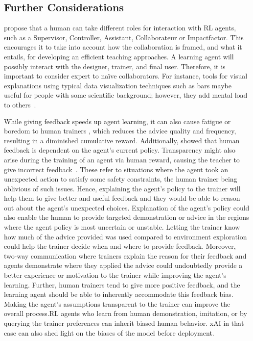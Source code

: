 \documentclass[twoside,11pt]{article}
\begin{document}
\subsection{Further Considerations}
\citet{WuEtAl:2021:HITLMLSurvey} propose that a human can take different roles for interaction with RL agents, such as a Supervisor, Controller, Assistant, Collaborateur or Impactfactor. This encourages it to take into account how the collaboration is framed, and what it entails, for developing an efficient teaching approaches. A learning agent will possibly interact with the designer, trainer, and final user. Therefore, it is important to consider expert to na\"ive collaborators. For instance, tools for visual explanations using typical data visualization techniques such as bars maybe useful for people with some scientific background; however, they add mental load to others~\citep{anderson:20}. 
 

While giving feedback speeds up agent learning, it can also cause fatigue or boredom to human trainers \citep{akalin:21}, which reduces the advice quality and frequency, resulting in a diminished cumulative reward. Additionally, \citet{macglashan2017interactive} showed that human feedback is dependent on the agent’s current policy.  Transparency might also arise during the training of an agent via human reward, causing the teacher to give incorrect feedback~\citep{knox:13}. These refer to situations where the agent took an unexpected action to satisfy some safety constraints, the human trainer being oblivious of such issues. Hence, explaining the agent’s policy to the trainer will help them to give better and useful feedback and they would be able to reason out about the agent’s unexpected choices. Explanation of the agent’s policy could also enable the human to provide targeted demonstration or advice in the regions where the agent policy is most uncertain or unstable.  Letting the trainer know how much of the advice provided was used compared to environment exploration could help the trainer decide when and where to provide feedback. Moreover, two-way communication where trainers explain the reason for their feedback and agents demonstrate where they applied the advice could undoubtedly provide a better experience or motivation to the trainer while improving the agent’s learning. Further, human trainers tend to give more positive feedback, and the learning agent should be able to inherently accommodate this feedback bias. Making the agent's assumptions transparent to the trainer can improve the overall process.RL agents who learn from human demonstration, imitation, or by querying the trainer preferences can inherit biased human behavior. xAI in that case can also shed light on the biases of the model before deployment.
\end{document}
